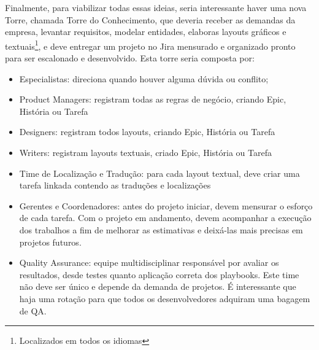 Finalmente, para viabilizar todas essas ideias, seria interessante haver uma nova Torre, chamada Torre do Conhecimento, que deveria receber as demandas da empresa, levantar requisitos, modelar entidades, elaboras layouts gráficos e textuais\footnote{Localizados em todos os idiomas}, e deve entregar um projeto no Jira mensurado e organizado pronto para ser escalonado e desenvolvido.
Esta torre seria composta por:
\begin{itemize}
    \item Especialistas: direciona quando houver alguma dúvida ou conflito;
    \item Product Managers: registram todas as regras de negócio, criando Epic, História ou Tarefa
    \item Designers: registram todos layouts, criando Epic, História ou Tarefa
    \item Writers: registram layouts textuais, criado Epic, História ou Tarefa
    \item Time de Localização e Tradução: para cada layout textual, deve criar uma tarefa linkada contendo as traduções e localizações
    \item Gerentes e Coordenadores: antes do projeto iniciar, devem mensurar o esforço de cada tarefa. Com o projeto em andamento, devem acompanhar a execução dos trabalhos a fim de melhorar as estimativas e deixá-las mais precisas em projetos futuros. 
    \item Quality Assurance: equipe multidisciplinar responsável por avaliar os resultados, desde testes quanto aplicação correta dos playbooks. Este time não deve ser único e depende da demanda de projetos. É interessante que haja uma rotação para que todos os desenvolvedores adquiram uma bagagem de QA.
\end{itemize}